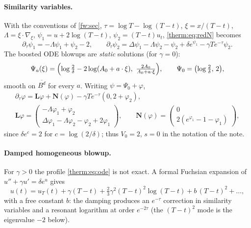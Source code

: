\paragraph{Similarity variables.}  With the conventions of \cref{fw:sec},
$\tau=\log T-\log(T-t)$, $\xi=x/(T-t)$, $\Lambda=\xi\cdot\nabla_\xi$,
$\psi_1=u+2\log(T-t)$, $\psi_2=(T-t)u_t$, \cref{therm:eq:redN} becomes
\begin{equation}\label{therm:eq:simred}
  \partial_\tau\psi_1=-\Lambda\psi_1+\psi_2-2,\qquad
  \partial_\tau\psi_2=\Delta\psi_1-\Lambda\psi_2-\psi_2+\delta e^{\psi_1}-\gamma T e^{-\tau}\psi_2 .
\end{equation}
The boosted ODE blowups are \emph{static} solutions (for $\gamma=0$):
\begin{equation}\label{therm:eq:Psia}
  \Psi_a(\xi)=\Bigl(\log\tfrac{2}{\delta}-2\log(A_0+a\cdot\xi),\ \tfrac{2A_0}{A_0+a\cdot\xi}\Bigr),
  \qquad \Psi_0=\bigl(\log\tfrac2\delta,\,2\bigr),
\end{equation}
smooth on $\overline{B^d}$ for every $a$.  Writing $\psi=\Psi_0+\varphi$,
\begin{equation}\label{therm:eq:linred}
\begin{gathered}
  \partial_\tau\varphi=\mathbf L\varphi+\mathbf N(\varphi)-\gamma Te^{-\tau}(0,2+\varphi_2),\\
  \mathbf L\varphi=\begin{pmatrix}-\Lambda\varphi_1+\varphi_2\\ \Delta\varphi_1-\Lambda\varphi_2-\varphi_2+2\varphi_1\end{pmatrix},\qquad
  \mathbf N(\varphi)=\begin{pmatrix}0\\ 2(e^{\varphi_1}-1-\varphi_1)\end{pmatrix},
\end{gathered}
\end{equation}
since $\delta e^{c}=2$ for $c=\log(2/\delta)$; thus $V_0=2$, $s=0$ in the notation
of the note.

\paragraph{Damped homogeneous blowup.}  For $\gamma>0$ the profile \cref{therm:eq:ode} is
not exact.  A formal Fuchsian expansion of $u''+\gamma u'=\delta e^u$ gives
\begin{equation}\label{therm:eq:damped}
  u(t)=u_T(t)+\gamma(T-t)+\tfrac23\gamma^2(T-t)^2\log(T-t)+b\,(T-t)^2+\dots ,
\end{equation}
with a free constant $b$: the damping produces an $e^{-\tau}$ correction in
similarity variables and a resonant logarithm at order $e^{-2\tau}$ (the
$(T-t)^2$ mode is the eigenvalue $-2$ below).

